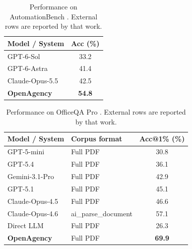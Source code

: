 \documentclass{article} %
\begin{document}
\begin{table}[t]
\caption{Performance on AutomationBench \citep{shepard2026automationbench}. External rows are reported by that work.}
\label{tab:autobench}
\begin{center}
\small
\setlength{\tabcolsep}{4pt}
\begin{tabular}{lc}
\toprule
\textbf{Model / System} & \textbf{Acc (\%)} \\
\midrule
GPT-6-Sol & 33.2 \\
GPT-6-Astra & 41.4 \\
Claude-Opus-5.5 & 42.5 \\
\midrule
\rowcolor{gray!12}
\textbf{OpenAgency} & \textbf{54.8} \\
\bottomrule
\end{tabular}
\end{center}
\end{table}

\begin{table}[t]
\caption{Performance on OfficeQA Pro \citep{opsahlong2026officeqa}. External rows are reported by that work.}
\label{tab:officeqa}
\begin{center}
\small
\setlength{\tabcolsep}{5pt}
\begin{tabular}{llc}
\toprule
\textbf{Model / System} & \textbf{Corpus format} & \textbf{Acc@1\% (\%)} \\
\midrule
GPT-5-mini                 & Full PDF                & 30.8 \\
GPT-5.4                    & Full PDF                & 36.1 \\
Gemini-3.1-Pro             & Full PDF                & 42.9 \\
GPT-5.1                    & Full PDF                & 45.1 \\
Claude-Opus-4.5            & Full PDF                & 46.6 \\
Claude-Opus-4.6 & ai\_parse\_document     & 57.1 \\
\midrule
Direct LLM                                               & Full PDF                & 26.3 \\
\rowcolor{gray!12}
\textbf{OpenAgency}                                  & Full PDF                & \textbf{69.9} \\
\bottomrule
\end{tabular}
\end{center}
\end{table}
\end{document}
